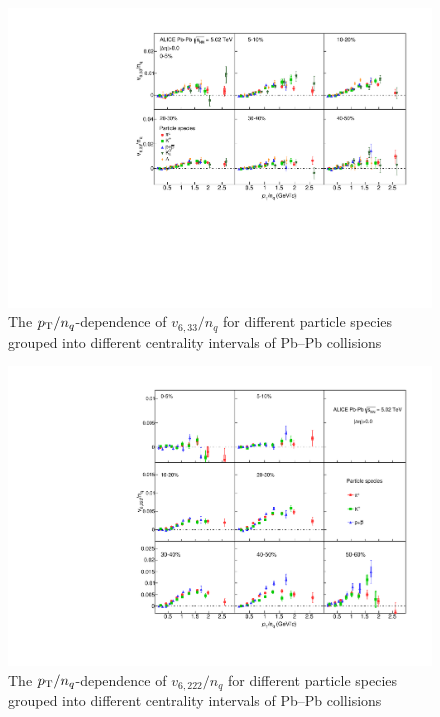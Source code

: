 \documentclass[ALICE,manyauthors]{cernphprep}
\providecommand{\DIFaddbeginFL}{} %
\providecommand{\DIFaddendFL}{} %
\providecommand{\DIFdelbeginFL}{} %
\providecommand{\DIFdelendFL}{} %
\begin{document}
\begin{figure}[!htb]
\begin{center}
\DIFdelbeginFL %
\DIFdelendFL %
\DIFaddbeginFL \includegraphics[scale=0.82]{figures/scaling/All_v633_gap00_NCQ_3by2.pdf}
\DIFaddendFL \end{center}
\caption{The $p_{\rm{T}}/n_{q}$-dependence of $v_{6,33}/n_{q}$ for different particle species grouped into different centrality intervals of Pb--Pb collisions \sNN}
\label{v633_NCQ}
\end{figure}

\begin{figure}[!htb]
\begin{center}
\DIFdelbeginFL %
\DIFdelendFL %
\DIFaddbeginFL \includegraphics[scale=0.82]{figures/scaling/All_v6222_gap00_NCQ_3by3.pdf}

\DIFaddendFL \end{center}
\caption{The $p_{\rm{T}}/n_{q}$-dependence of $v_{6,222}/n_{q}$ for different particle species grouped into different centrality intervals of Pb--Pb collisions \sNN}
\label{v6222_NCQ}
\end{figure}
\end{document}
